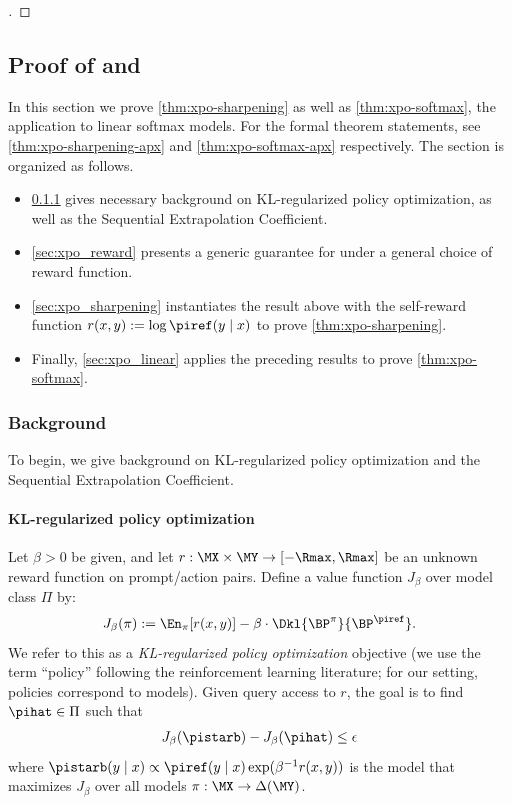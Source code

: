 \begin{proof}[]
        \end{proof}        

\subsection{Proof of  and }
\label{sec:proofs_exploration}

In this section we prove \cref{thm:xpo-sharpening} as well as
\cref{thm:xpo-softmax}, the application to linear softmax models. For
the formal theorem statements, see \cref{thm:xpo-sharpening-apx} and
\cref{thm:xpo-softmax-apx} respectively. The section is organized as
follows.
\begin{itemize}
\item \cref{sec:xpo_background} gives necessary background on
  KL-regularized policy optimization, as well as the Sequential
  Extrapolation Coefficient.
\item \cref{sec:xpo_reward} presents a generic guarantee for \xpo
  under a general choice of reward function.
\item \cref{sec:xpo_sharpening} instantiates the result above with the
  self-reward function $r(x,y) := \log \piref(y \mid x)$ to prove
  \cref{thm:xpo-sharpening}.
\item Finally, \cref{sec:xpo_linear} applies the preceding results to
  prove \cref{thm:xpo-softmax}.
\end{itemize}

\subsubsection{Background}
\label{sec:xpo_background}
To begin, we give background on KL-regularized policy optimization and the Sequential Extrapolation Coefficient. %

\paragraph{KL-regularized policy optimization} Let $\beta>0$ be given,
and let $r: \MX \times \MY \to [-\Rmax,\Rmax]$ be an unknown reward
function on prompt/action pairs. Define a value function $J_\beta$
over model class $\Pi$ by:
\begin{align}
  J_\beta(\pi) := \En_\pi[r(x,y)] - \beta \cdot
  \Dkl{\BP^\pi}{\BP^{\piref}}.
\end{align}
We refer to this as a \emph{KL-regularized policy optimization}
objective (we use the term ``policy'' following the reinforcement learning
literature; for our setting, policies correspond to models). Given query access to $r$, the goal is to find $\pihat \in\Pi$ such that 
\begin{align}
  J_\beta(\pistarb) - J_\beta(\pihat) \leq \epsilon
\end{align}
where $\pistarb(y\mid x) \propto \piref(y\mid x) \exp(\beta^{-1}
r(x,y))$ is the model that maximizes $J_\beta$ over all models $\pi: \MX \to \Delta(\MY)$.

